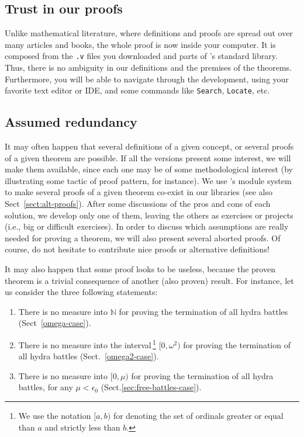 \documentclass[twoside,a4paper]{book}
\begin{document}
\subsection{Trust in our proofs}
\label{sect:trust-in-proofs}

Unlike mathematical literature, where definitions and proofs are spread out over many articles and books,
the whole proof is now inside your computer. It is composed from the \texttt{.v} files you downloaded and
parts of \coq's standard library. Thus, there is no ambiguity in our definitions and the premises of the theorems. Furthermore, you will be able to navigate through the development, using your favorite text editor or IDE, and some commands like \texttt{Search}, \texttt{Locate},  etc.



\subsection{Assumed redundancy}

It may often happen that several definitions of a given concept, or several proofs of a given theorem are possible. If all the versions present some interest, we will make them available, since each one may be of some methodological 
interest (by illustrating some tactic of proof pattern, for instance).
We use \coq's module system to make several proofs of a given theorem co-exist in our libraries (see also Sect~\vref{sect:alt-proofs}).
After some discussions of the pros and cons of each solution, we develop only one of them, leaving the others  as exercises or projects (i.e., big or difficult exercises).
In order to discuss which assumptions are really needed for proving a theorem, we will also present 
several aborted proofs.
Of course, do not hesitate to contribute nice proofs or alternative definitions!

It may also happen that some proof looks to be useless, because the proven theorem is a trivial consequence of another (also proven) result.
For instance, let us consider the three following statements:
\begin{enumerate}
\item There is no measure into $\mathbb{N}$ for proving the termination of all hydra battles (Sect~\vref{omega-case}).
\item There is no measure into the interval\,\footnote{We use the notation $[a,b)$ for denoting the set of ordinals greater or equal than $a$ and strictly less than $b$.}  $[0,\omega^2)$ for proving the termination of all hydra battles (Sect.~\vref{omega2-case}).
\item There is no measure into $[0,\mu)$ for proving the termination of all hydra battles, for any $\mu<\epsilon_0$ (Sect.\vref{sec:free-battles-case}).
\end{enumerate}
\end{document}
